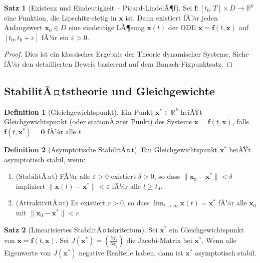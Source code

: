 ﻿\documentclass[a4paper,12pt]{article}
\theoremstyle{definition}
\newtheorem{definition}{Definition}
\newtheorem{satz}{Satz}
\begin{document}
\begin{satz}[Existenz und Eindeutigkeit -- Picard-LindelÃ¶f]
Sei $\mathbf{f}: [t_0, T] \times D \to \mathbb{R}^k$ eine Funktion, die Lipschitz-stetig in $\mathbf{x}$ ist. Dann existiert fÃ¼r jeden Anfangswert $\mathbf{x}_0 \in D$ eine eindeutige LÃ¶sung $\mathbf{x}(t)$ der ODE $\dot{\mathbf{x}} = \mathbf{f}(t, \mathbf{x})$ auf $[t_0, t_0 + \varepsilon]$ fÃ¼r ein $\varepsilon > 0$.
\end{satz}

\begin{proof}
Dies ist ein klassisches Ergebnis der Theorie dynamischer Systeme. Siehe \cite{coddington1955theory} fÃ¼r den detaillierten Beweis basierend auf dem Banach-Fixpunktsatz.
\end{proof}

\subsection{StabilitÃ¤tstheorie und Gleichgewichte}

\begin{definition}[Gleichgewichtspunkt]
Ein Punkt $\mathbf{x}^* \in \mathbb{R}^k$ heiÃŸt Gleichgewichtspunkt (oder stationÃ¤rer Punkt) des Systems $\dot{\mathbf{x}} = \mathbf{f}(t, \mathbf{x})$, falls $\mathbf{f}(t, \mathbf{x}^*) = \mathbf{0}$ fÃ¼r alle $t$.
\end{definition}

\begin{definition}[Asymptotische StabilitÃ¤t]
Ein Gleichgewichtspunkt $\mathbf{x}^*$ heiÃŸt asymptotisch stabil, wenn:
\begin{enumerate}
\item (StabilitÃ¤t) FÃ¼r alle $\varepsilon > 0$ existiert $\delta > 0$, so dass $\|\mathbf{x}_0 - \mathbf{x}^*\| < \delta$ impliziert $\|\mathbf{x}(t) - \mathbf{x}^*\| < \varepsilon$ fÃ¼r alle $t \geq t_0$.
\item (AttraktivitÃ¤t) Es existiert $r > 0$, so dass $\lim_{t \to \infty} \mathbf{x}(t) = \mathbf{x}^*$ fÃ¼r alle $\mathbf{x}_0$ mit $\|\mathbf{x}_0 - \mathbf{x}^*\| < r$.
\end{enumerate}
\end{definition}

\begin{satz}[Linearisiertes StabilitÃ¤tskriterium]
Sei $\mathbf{x}^*$ ein Gleichgewichtspunkt von $\dot{\mathbf{x}} = \mathbf{f}(t, \mathbf{x})$. Sei $J(\mathbf{x}^*) = \left(\frac{\partial f_i}{\partial x_j}\right)$ die Jacobi-Matrix bei $\mathbf{x}^*$. Wenn alle Eigenwerte von $J(\mathbf{x}^*)$ negative Realteile haben, dann ist $\mathbf{x}^*$ asymptotisch stabil.
\end{satz}
\end{document}
